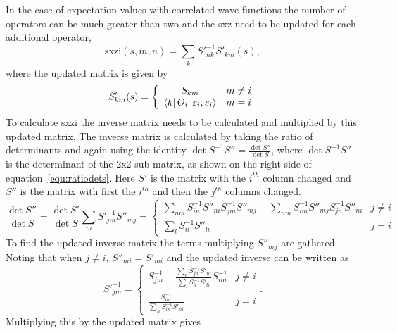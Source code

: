 In the case of expectation values with correlated wave functions the number of operators can be much greater than two and the sxz need to be updated for each additional operator,
\begin{equation}
   \mathrm{sxzi}(s,m,n)=\sum\limits_k S'^{-1}_{nk}S'_{km}(s),
\end{equation}
where the updated matrix is given by
\begin{equation}
   S'_{km}(s) = \left\{
   \begin{array}{cc}
      S_{km} & m \ne i\\
      \left< k \right|O_i\left| \mathbf{r}_i,s_i \right> & m = i
   \end{array}
   \right.
\end{equation}
To calculate sxzi the inverse matrix needs to be calculated and multiplied by this updated matrix. The inverse matrix is calculated by taking the ratio of determinants and again using the identity $\det S^{-1}S'' = \frac{\det S''}{\det S}$, where $\det S^{-1}S''$ is the determinant of the 2x2 sub-matrix, as shown on the right side of equation~\ref{equ:ratiodets}. Here $S'$ is the matrix with the $i^{th}$ column changed and $S''$ is the matrix with first the $i^{th}$ and then the $j^{th}$ columns changed.
\begin{equation}
   \label{equ:ratiodets}
   \frac{\det S''}{\det S} = \frac{\det S'}{\det S} \sum\limits_m S'^{-1}_{jm}S''_{mj} = \left\{
   \begin{array}{cc}
      \sum\limits_{nm} S^{-1}_{in}S''_{ni}S^{-1}_{jm}S''_{mj} - \sum\limits_{nm}S^{-1}_{im}S''_{mj}S^{-1}_{jn}S''_{ni} & j \ne i \\
      \sum\limits_l S^{-1}_{il}S''_{li} & j = i
   \end{array}
   \right.
\end{equation}
To find the updated inverse matrix the terms multiplying $S''_{mj}$ are gathered. Noting that when $j \ne i$, $S''_{mi}=S'_{mi}$ and the updated inverse can be written as
\begin{equation}
   S'^{-1}_{jm} = \left\{
   \begin{array}{cc}
      S^{-1}_{jm} - \frac{\sum\limits_nS^{-1}_{jn}S'_{ni}}{\sum\limits_lS^{-1}_{il}S'_{li}}S^{-1}_{im} & j \ne i \\
      \frac{S^{-1}_{im}}{\sum\limits_nS^{-1}_{in}S'_{ni}} & j = i
   \end{array}
   \right. .
\end{equation}
Multiplying this by the updated matrix gives
